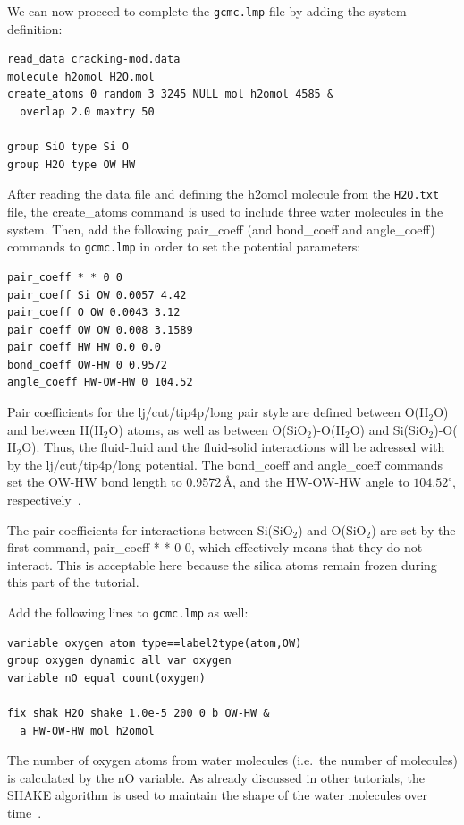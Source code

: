 \documentclass[9pt,tutorial]{livecoms}
\newcommand{\lmpcmd}[1]{\colorbox{listing}{\textcolor{command}{\small{#1}}}} %
\newcommand{\flecmd}[1]{\textcolor{command}{\texttt{#1}}} %
\begin{document}
We can now proceed to complete the \flecmd{gcmc.lmp} file by adding the system definition:
\begin{lstlisting}
read_data cracking-mod.data
molecule h2omol H2O.mol
create_atoms 0 random 3 3245 NULL mol h2omol 4585 &
  overlap 2.0 maxtry 50

group SiO type Si O
group H2O type OW HW
\end{lstlisting}
After reading the data file and defining the \lmpcmd{h2omol} molecule from the \flecmd{H2O.txt}
file, the \lmpcmd{create\_atoms} command is used to include three water molecules
in the system.  Then, add the following \lmpcmd{pair\_coeff} (and
\lmpcmd{bond\_coeff} and \lmpcmd{angle\_coeff}) commands
to \flecmd{gcmc.lmp} in order to set the potential parameters:
\begin{lstlisting}
pair_coeff * * 0 0
pair_coeff Si OW 0.0057 4.42
pair_coeff O OW 0.0043 3.12
pair_coeff OW OW 0.008 3.1589
pair_coeff HW HW 0.0 0.0
bond_coeff OW-HW 0 0.9572
angle_coeff HW-OW-HW 0 104.52
\end{lstlisting}
Pair coefficients for the \lmpcmd{lj/cut/tip4p/long} pair style are
defined between O($\text{H}_2\text{O}$) and between H($\text{H}_2\text{O}$)
atoms, as well as between O($\text{SiO}_2$)-O($\text{H}_2\text{O}$) and
Si($\text{SiO}_2$)-O($\text{H}_2\text{O}$).  Thus, the fluid-fluid and the
fluid-solid interactions will be adressed with by the \lmpcmd{lj/cut/tip4p/long} potential.
The \lmpcmd{bond\_coeff} and \lmpcmd{angle\_coeff} commands set the \lmpcmd{OW-HW}
bond length to 0.9572\,\AA, and the \lmpcmd{HW-OW-HW}
angle to $104.52^\circ$, respectively~\cite{abascal2005general}.

\begin{note}
  The pair coefficients for interactions between Si($\text{SiO}_2$)
  and O($\text{SiO}_2$) are set by the first command, \lmpcmd{pair\_coeff * * 0 0},
  which effectively means that they do not interact. This is acceptable here because
  the silica atoms remain frozen during this part of the tutorial.
\end{note}

Add the following lines to \flecmd{gcmc.lmp} as well:
\begin{lstlisting}
variable oxygen atom type==label2type(atom,OW)
group oxygen dynamic all var oxygen
variable nO equal count(oxygen)

fix shak H2O shake 1.0e-5 200 0 b OW-HW &
  a HW-OW-HW mol h2omol
\end{lstlisting}
The number of oxygen atoms from water molecules (i.e.~the number of molecules)
is calculated by the \lmpcmd{nO} variable.  As already discussed in other
tutorials, the SHAKE algorithm is used to
maintain the shape of the water molecules over time~\cite{ryckaert1977numerical, andersen1983rattle}.
\end{document}
